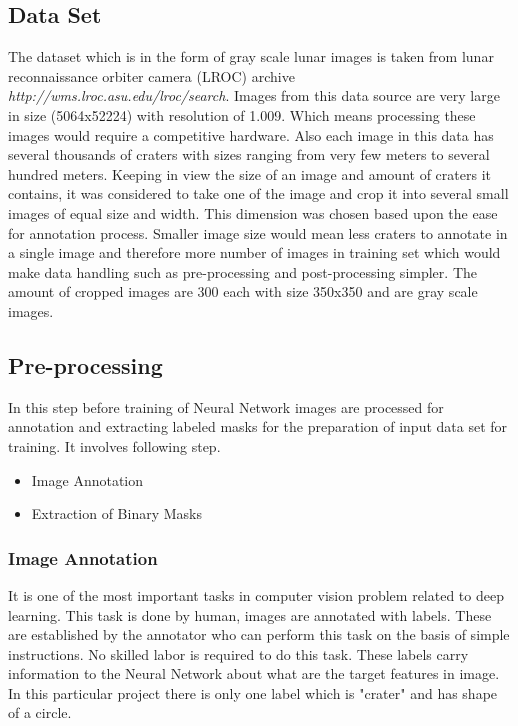 \documentclass[11pt]{article}
\begin{document}
\subsection{Data Set}
The dataset which is in the form of gray scale lunar images is taken from lunar reconnaissance orbiter camera (LROC) archive \textit{http://wms.lroc.asu.edu/lroc/search}. Images from this data source are very large in size (5064x52224) with resolution of 1.009. Which means processing these images would require a competitive hardware. Also each image in this data has several thousands of craters with sizes ranging from very few meters to several hundred meters. Keeping in view the size of an image and amount of craters it contains, it was considered to take one of the image and crop it into several small images of equal size and width. This dimension was chosen based upon the ease for annotation process. Smaller image size would mean less craters to annotate in a single image and therefore more number of images in training set which would make data handling such as pre-processing and post-processing simpler. The amount of cropped images are 300 each with size 350x350 and are gray scale images.

\subsection{Pre-processing}
In this step before training of Neural Network images are processed for annotation and extracting labeled masks for the preparation of input data set for training. It involves following step.

\begin{itemize}
\item {Image Annotation}
\item {Extraction of Binary Masks}
\end{itemize}

\subsubsection{Image Annotation}
It is one of the most important tasks in computer vision problem related to deep learning. This task is done by human, images are annotated with labels. These are established by the annotator who can perform this task on the basis of simple instructions. No skilled labor is required to do this task. These labels carry information to the Neural Network about what are the target features in image. In this particular project there is only one label which is "crater" and has shape of a circle.
 
\end{document}
